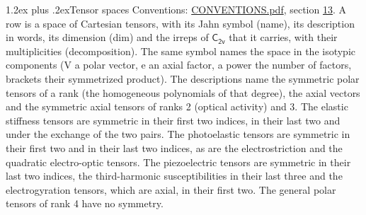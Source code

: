 \documentclass[10pt,a4paper]{article}
\makeatletter
\renewcommand\section{\@startsection{section}{1}{\z@}{-3ex plus -1ex minus -.2ex}%
  {1.2ex plus .2ex}{\normalfont\large\sffamily\bfseries\color{parttitle}}}
\numberwithin{equation}{section}
\newcommand{\grp}[1]{\mathsf{#1}}
\makeatother
\begin{document}
\section{Tensor spaces}\label{s:tensor_spaces}
Conventions: \href{../../CONVENTIONS.pdf}{CONVENTIONS.pdf}, section \href{../../CONVENTIONS.pdf\#conv.13}{13}.
\leavevmode\label{n:head.name}\label{n:head.description}\label{n:head.dim}\label{n:head.decomposition}A row is a space of Cartesian tensors, with its Jahn symbol (name), its description in words, its dimension (dim) and the irreps of $\grp{C_{2v}}$ that it carries, with their multiplicities (decomposition). \label{n:label.jahn}The same symbol names the space in the isotypic components (V a polar vector, e an axial factor, a power the number of factors, brackets their symmetrized product). The descriptions name the symmetric polar tensors of a rank (the homogeneous polynomials of that degree), the axial vectors and the symmetric axial tensors of ranks 2 (optical activity) and 3. The elastic stiffness tensors are symmetric in their first two indices, in their last two and under the exchange of the two pairs. The photoelastic tensors are symmetric in their first two and in their last two indices, as are the electrostriction and the quadratic electro-optic tensors. The piezoelectric tensors are symmetric in their last two indices, the third-harmonic susceptibilities in their last three and the electrogyration tensors, which are axial, in their first two. The general polar tensors of rank 4 have no symmetry.
\end{document}

